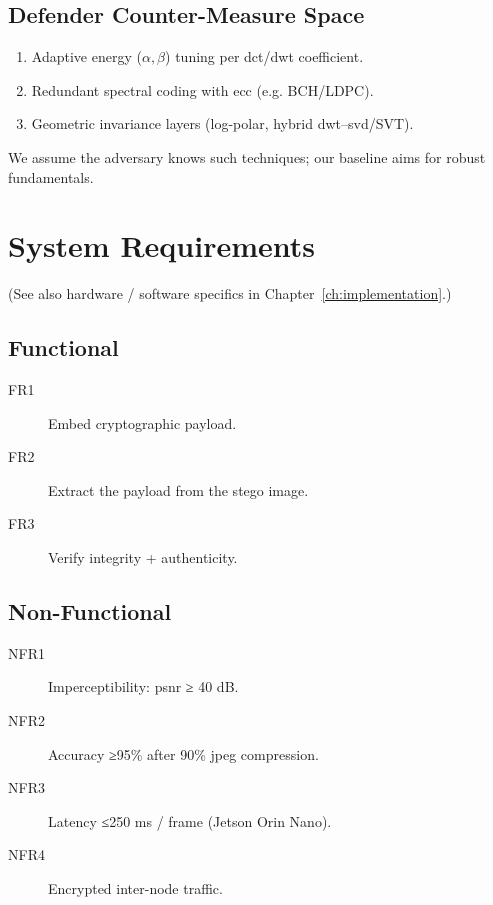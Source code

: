 \subsection{Defender Counter-Measure Space}\label{subsec:defender-counter-measure-space}
\begin{enumerate}
  \item Adaptive energy ($\alpha,\beta$) tuning per \gls{dct}/\gls{dwt} coefficient.
  \item Redundant spectral coding with \gls{ecc} (e.g. BCH/LDPC).
  \item Geometric invariance layers (log-polar, hybrid \gls{dwt}–\gls{svd}/SVT).
\end{enumerate}
We assume the adversary knows such techniques; our baseline aims for robust fundamentals.

\section{System Requirements}
\label{sec:deep_dive:requirements}
(See also hardware / software specifics in Chapter~\ref{ch:implementation}.)

\subsection{Functional}\label{subsec:functional}
\begin{description}
  \item[FR1] Embed cryptographic payload.
  \item[FR2] Extract the payload from the stego image.
  \item[FR3] Verify integrity + authenticity.
\end{description}

\subsection{Non-Functional}\label{subsec:non-functional}
\begin{description}
  \item[NFR1] Imperceptibility: \gls{psnr} ≥ 40 dB\@.
  \item[NFR2] Accuracy ≥95\% after 90\% \gls{jpeg} compression.
  \item[NFR3] Latency ≤250 ms / frame (Jetson Orin Nano).
  \item[NFR4] Encrypted inter-node traffic.
\end{description}

